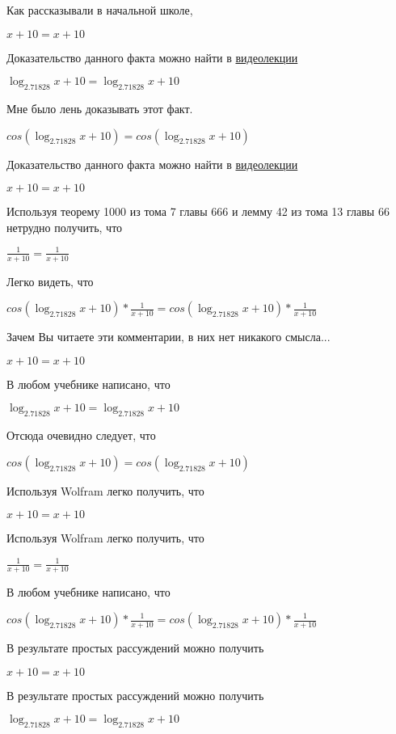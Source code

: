 \documentclass[12pt,a4paper,fleqn]{article}
\theoremstyle{definition}
\begin{document}
Как рассказывали в начальной школе, 

$ x  +  10  =  x  +  10 $

Доказательство данного факта можно найти в \href{https://www.youtube.com/watch?v=dQw4w9WgXcQ}{видеолекции} 

$\log_{ 2.71828 }{ x  +  10 } = \log_{ 2.71828 }{ x  +  10 }$

Мне было лень доказывать этот факт.

$cos(\log_{ 2.71828 }{ x  +  10 }) = cos(\log_{ 2.71828 }{ x  +  10 })$

Доказательство данного факта можно найти в \href{https://www.youtube.com/watch?v=dQw4w9WgXcQ}{видеолекции} 

$ x  +  10  =  x  +  10 $

Используя теорему 1000 из тома 7 главы 666 и лемму 42 из тома 13 главы 66 нетрудно получить, что 

$\frac{ 1 }{ x  +  10 }
 = \frac{ 1 }{ x  +  10 }
$

Легко видеть, что 

$cos(\log_{ 2.71828 }{ x  +  10 }) * \frac{ 1 }{ x  +  10 }
 = cos(\log_{ 2.71828 }{ x  +  10 }) * \frac{ 1 }{ x  +  10 }
$

Зачем Вы читаете эти комментарии, в них нет никакого смысла... 

$ x  +  10  =  x  +  10 $

В любом учебнике написано, что 

$\log_{ 2.71828 }{ x  +  10 } = \log_{ 2.71828 }{ x  +  10 }$

Отсюда очевидно следует, что 

$cos(\log_{ 2.71828 }{ x  +  10 }) = cos(\log_{ 2.71828 }{ x  +  10 })$

Используя Wolfram легко получить, что 

$ x  +  10  =  x  +  10 $

Используя Wolfram легко получить, что 

$\frac{ 1 }{ x  +  10 }
 = \frac{ 1 }{ x  +  10 }
$

В любом учебнике написано, что 

$cos(\log_{ 2.71828 }{ x  +  10 }) * \frac{ 1 }{ x  +  10 }
 = cos(\log_{ 2.71828 }{ x  +  10 }) * \frac{ 1 }{ x  +  10 }
$

В результате простых рассуждений можно получить 

$ x  +  10  =  x  +  10 $

В результате простых рассуждений можно получить 

$\log_{ 2.71828 }{ x  +  10 } = \log_{ 2.71828 }{ x  +  10 }$
\end{document}
